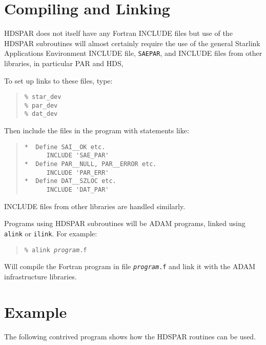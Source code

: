 \documentclass[twoside,11pt]{article}
\newcommand{\xref}[3]{#1}
\newcommand{\xlabel}[1]{}
\renewcommand{\_}{\texttt{\symbol{95}}}
\begin{document}
\section{\xlabel{compiling_and_linking}Compiling and Linking}
HDSPAR does not itself have any Fortran
\xref{INCLUDE files}{sun144}{include_files}
but use of the HDSPAR subroutines will almost certainly require the use of
the general Starlink Applications Environment INCLUDE file, \texttt{SAE\_PAR},
and INCLUDE files from other libraries, in particular
\xref{PAR}{sun114}{abort_and_null}
and
\xref{HDS}{sun92}{routines_and_constants},

To set up links to these files, type:
\begin{quote} \begin{verbatim}
% star_dev
% par_dev
% dat_dev
\end{verbatim} \end{quote}
Then include the files in the program with statements like:
\begin{quote} \begin{verbatim}
*  Define SAI__OK etc.
      INCLUDE 'SAE_PAR'
*  Define PAR__NULL, PAR__ERROR etc.
      INCLUDE 'PAR_ERR'
*  Define DAT__SZLOC etc.
      INCLUDE 'DAT_PAR'
\end{verbatim} \end{quote}
INCLUDE files from other libraries are handled similarly.

Programs using HDSPAR subroutines will be ADAM programs, linked using
\xref{\texttt{alink} or \texttt{ilink}}{sun144}{adam_link_scripts}.
For example:
\begin{quote}
\texttt{\% alink \textit{program}.f}
\end{quote}
Will compile the Fortran program in file \texttt{\textit{program}.f} and link
it with the ADAM infrastructure libraries.

\section{\xlabel{example}Example\label{example}}
The following contrived program shows how the HDSPAR routines can be used.
\end{document}
